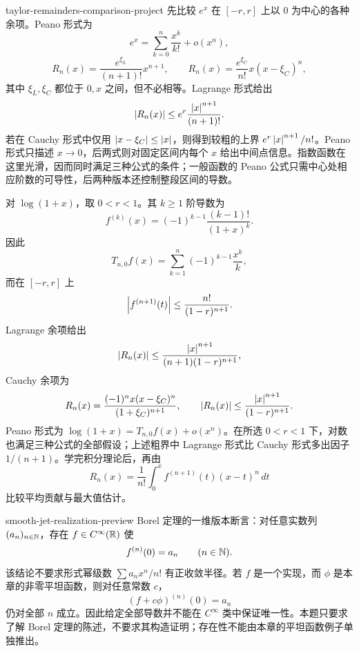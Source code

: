 \begin{solution}{taylor-remainders-comparison-project}
先比较 \(e^x\) 在 \([-r,r]\) 上以 \(0\) 为中心的各种余项。Peano 形式为
\[
 e^x=\sum_{k=0}^{n}\frac{x^k}{k!}+o(x^n),
\]
\[
 R_n(x)=\frac{e^{\xi_L}}{(n+1)!}x^{n+1},
\qquad
 R_n(x)=\frac{e^{\xi_C}}{n!}x(x-\xi_C)^n,
\]
其中 \(\xi_L,\xi_C\) 都位于 \(0,x\) 之间，但不必相等。Lagrange 形式给出
\[
 \left|R_n(x)\right|\le e^r\frac{\left|x\right|^{n+1}}{(n+1)!}.
\]
若在 Cauchy 形式中仅用 \(\left|x-\xi_C\right|\le\left|x\right|\)，则得到较粗的上界 \(e^r\left|x\right|^{n+1}/n!\)。Peano 形式只描述 \(x\to0\)，后两式则对固定区间内每个 \(x\) 给出中间点信息。指数函数在这里光滑，因而同时满足三种公式的条件；一般函数的 Peano 公式只需中心处相应阶数的可导性，后两种版本还控制整段区间的导数。

对 \(\log(1+x)\)，取 \(0<r<1\)。其 \(k\ge1\) 阶导数为
\[
 f^{(k)}(x)=(-1)^{k-1}\frac{(k-1)!}{(1+x)^k}.
\]
因此
\[
 T_{n,0}f(x)=\sum_{k=1}^{n}(-1)^{k-1}\frac{x^k}{k},
\]
而在 \([-r,r]\) 上
\[
 \left|f^{(n+1)}(t)\right|
 \le\frac{n!}{(1-r)^{n+1}}.
\]
Lagrange 余项给出
\[
 \left|R_n(x)\right|
 \le\frac{\left|x\right|^{n+1}}{(n+1)(1-r)^{n+1}},
\]
Cauchy 余项为
\[
 R_n(x)=\frac{(-1)^n x(x-\xi_C)^n}{(1+\xi_C)^{n+1}},
 \qquad
 \left|R_n(x)\right|\le\frac{\left|x\right|^{n+1}}{(1-r)^{n+1}}.
\]
Peano 形式为 \(\log(1+x)=T_{n,0}f(x)+o(x^n)\)。在所选 \(0<r<1\) 下，对数也满足三种公式的全部假设；上述粗界中 Lagrange 形式比 Cauchy 形式多出因子 \(1/(n+1)\)。学完积分理论后，再由
\[
 R_n(x)=\frac1{n!}\int_0^x f^{(n+1)}(t)(x-t)^n\,dt
\]
比较平均贡献与最大值估计。
\end{solution}

\begin{solution}{smooth-jet-realization-preview}
Borel 定理的一维版本断言：对任意实数列 \((a_n)_{n\in\mathbb{N}}\)，存在
\(f\in C^\infty(\mathbb{R})\) 使
\[
 f^{(n)}(0)=a_n\qquad(n\in\mathbb{N}).
\]
该结论不要求形式幂级数 \(\sum a_nx^n/n!\) 有正收敛半径。若 \(f\) 是一个实现，而
\(\phi\) 是本章的非零平坦函数，则对任意常数 \(c\)，
\[
 (f+c\phi)^{(n)}(0)=a_n
\]
仍对全部 \(n\) 成立。因此给定全部导数并不能在 \(C^\infty\) 类中保证唯一性。本题只要求了解 Borel 定理的陈述，不要求其构造证明；存在性不能由本章的平坦函数例子单独推出。
\end{solution}
